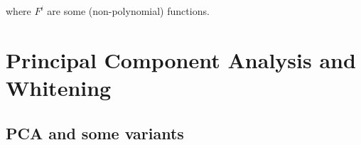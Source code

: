 \documentclass[a4paper, one	side]{book}
\begin{document}
\begin{itemize}
\begin{itemize}
	where $F^i$ are some (non-polynomial) functions.
	\end{itemize}

\end{itemize}








\chapter{Principal Component Analysis and Whitening}

\section{PCA and some variants}
\end{document}
